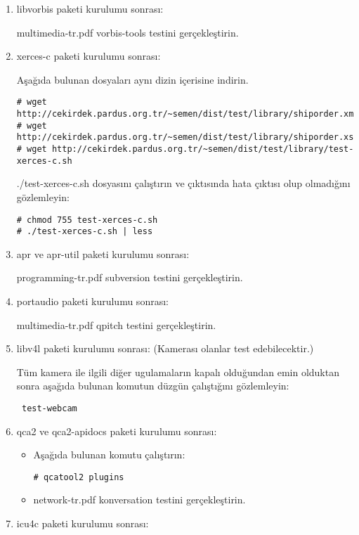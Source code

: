 \documentclass[a4paper,10pt]{article}
\begin{document}
\begin{enumerate}
\item libvorbis paketi kurulumu sonrası:

multimedia-tr.pdf vorbis-tools testini gerçekleştirin.

\item xerces-c paketi kurulumu sonrası:

Aşağıda bulunan dosyaları aynı dizin içerisine indirin.
\begin{verbatim}
# wget http://cekirdek.pardus.org.tr/~semen/dist/test/library/shiporder.xml
# wget http://cekirdek.pardus.org.tr/~semen/dist/test/library/shiporder.xsd
# wget http://cekirdek.pardus.org.tr/~semen/dist/test/library/test-xerces-c.sh
\end{verbatim}

./test-xerces-c.sh dosyasını çalıştırın ve çıktısında hata çıktısı olup olmadığını gözlemleyin:
\begin{verbatim}
# chmod 755 test-xerces-c.sh
# ./test-xerces-c.sh | less
\end{verbatim}

\item apr ve apr-util paketi kurulumu sonrası:

programming-tr.pdf subversion testini gerçekleştirin.

\item portaudio paketi kurulumu sonrası:

multimedia-tr.pdf qpitch testini gerçekleştirin.

\item libv4l paketi kurulumu sonrası: (Kamerası olanlar test edebilecektir.)

Tüm kamera ile ilgili diğer ugulamaların kapalı olduğundan emin olduktan sonra aşağıda bulunan komutun düzgün çalıştığını gözlemleyin:
\begin{verbatim}
 test-webcam
\end{verbatim}

\item qca2 ve qca2-apidocs paketi kurulumu sonrası:
\begin{itemize}
 \item Aşağıda bulunan komutu çalıştırın:
\begin{verbatim}
# qcatool2 plugins 
\end{verbatim}
\item network-tr.pdf konversation testini gerçekleştirin.
\end{itemize}


\item icu4c paketi kurulumu sonrası:


\end{enumerate}
\end{document}
